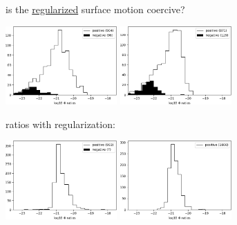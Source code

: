 \documentclass[10pt,svgnames]{beamer}
\newcommand{\aler}[1]{{\color{FireBrick} #1}}
\begin{document}
\begin{frame}{is the \underline{regularized} surface motion coercive?}
\begin{itemize}
{\medskip
\hfill
\includegraphics[width=0.32\textwidth]{figs/bflat500mNOREG.png} \qquad \includegraphics[width=0.32\textwidth]{figs/brough500mNOREG.png}

\item \aler{ratios with regularization}:

\medskip
\hfill
\includegraphics[width=0.32\textwidth]{figs/bflat500mREG.png} \qquad \includegraphics[width=0.32\textwidth]{figs/brough500mREG.png}
}
\end{itemize}
\end{frame}
\end{document}
